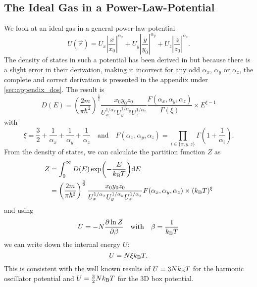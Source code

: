\subsection{The Ideal Gas in a Power-Law-Potential}
We look at an ideal gas in a general power-law-potential
%
\begin{equation*}
    U(\vec{r}) = U_x \left| \frac{x}{x_0} \right|^{\alpha_x} + U_y \left| \frac{y}{y_0} \right|^{\alpha_y} + U_z \left| \frac{z}{z_0} \right|^{\alpha_z}.
\end{equation*}
%
The density of states in such a potential has been derived in \cite{PhysRevA.35.4354} but because there is a slight error in their derivation, making it incorrect for any odd $\alpha_x$, $\alpha_y$ or $\alpha_z$, the complete and correct derivation is presented in the appendix under \ref{sec:appendix_dos}. The result is
%
\begin{equation*} %
    D(E) = \left(\frac{2m}{\pi\hbar^2}\right)^\frac{3}{2} \frac{x_0 y_0 z_0}{U_x^{1/\alpha_x} U_y^{1/\alpha_y} U_z^{1/\alpha_z}} \frac{F(\alpha_x,\alpha_y,\alpha_z)}{\Gamma(\xi)} \times E^{\xi - 1}
\end{equation*}
with
\begin{equation*}
    \xi = \frac{3}{2} + \frac{1}{\alpha_x} + \frac{1}{\alpha_y} + \frac{1}{\alpha_z} \quad \text{and} \quad F(\alpha_x, \alpha_y, \alpha_z) = \prod_{i \in \{x,y,z\}} \Gamma\!\left(1 + \frac{1}{\alpha_i}\right).
\end{equation*}
%
From the density of states, we can calculate the partition function $Z$ as
\begin{align*}
    Z &= \int_0^\infty D(E)\exp{\!\left(-\frac{E}{\ensuremath{k_\text{B}}T}\right)} \text{d}E \nonumber \\
      &= \left(\frac{2m}{\pi\hbar^2}\right)^\frac{3}{2} \frac{x_0 y_0 z_0}{U_x^{1/\alpha_x} U_y^{1/\alpha_y} U_z^{1/\alpha_z}} F(\alpha_x, \alpha_y, \alpha_z) \times (k_\text{B} T)^\xi \label{eq:partition_function}
\end{align*}
and using \cite{laurendeau_2005}
\begin{equation}
    U = -N \frac{\partial \ln Z}{\partial \beta} \quad \text{with} \quad \beta = \frac{1}{k_\text{B} T} \nonumber
\end{equation}
we can write down the internal energy $U$:
\begin{equation*}
    U = N \xi k_\text{B} T.
\end{equation*}
This is consistent with the well known results of $U = 3Nk_\text{B} T$ for the harmonic oscillator potential and $U = \frac{3}{2} N k_\text{B} T$ for the 3D box potential.

